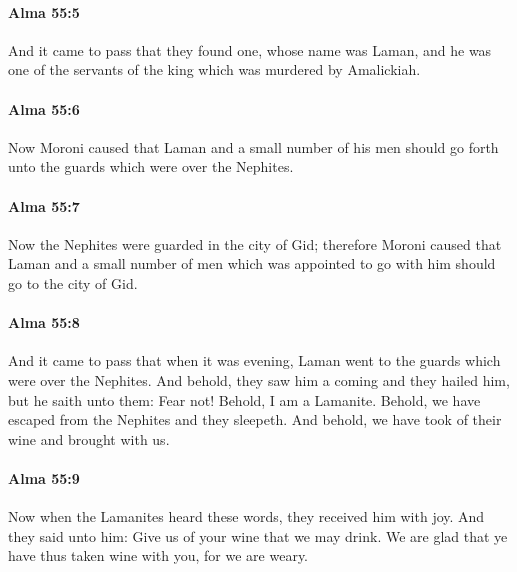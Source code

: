 		\paragraph{Alma 55:5} %
			\label{ALMA-55-5}

			And it came to pass that they found one, whose name was Laman,
			and he was one of the servants of the king which was murdered by Amalickiah.

		\paragraph{Alma 55:6} %
			\label{ALMA-55-6}

			Now Moroni caused that Laman and a small number of his men
			should go forth unto the guards which were over the Nephites.

		\paragraph{Alma 55:7} %
			\label{ALMA-55-7}

			Now the Nephites were guarded in the city of Gid;
			therefore Moroni caused that Laman and a small number of men
			which was appointed to go with him
			should go to the city of Gid.

		\paragraph{Alma 55:8} %
			\label{ALMA-55-8}

			And it came to pass that when it was evening,
			Laman went to the guards which were over the Nephites.
			And behold, they saw him a coming and they hailed him,
			but he saith unto them:
			Fear not!
			Behold, I am a Lamanite.
			Behold, we have escaped from the Nephites and they sleepeth.
			And behold, we have took of their wine and brought with us.

		\paragraph{Alma 55:9} %
			\label{ALMA-55-9}

			Now when the Lamanites heard these words,
			they received him with joy.
			And they said unto him:
			Give us of your wine that we may drink.
			We are glad that ye have thus taken wine with you,
			for we are weary.

